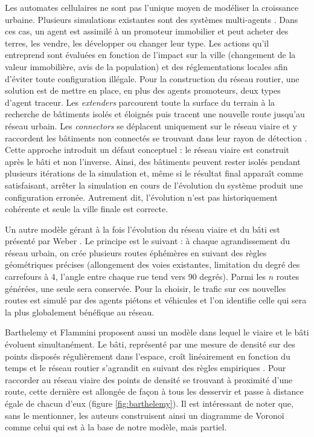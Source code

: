 \documentclass[10pt]{article}
\begin{document}
Les automates cellulaires ne sont pas l'unique moyen de modéliser la
croissance urbaine. Plusieurs simulations existantes sont des systèmes
multi-agents \cite{Lechner2003,Lechner2004}. Dans ces cas, un agent est
assimilé à un promoteur immobilier et peut acheter des terres, les
vendre, les développer ou changer leur type. Les actions qu'il
entreprend sont évaluées en fonction de l'impact sur la ville
(changement de la valeur immobilière, avis de la population) et des
réglementations locales afin d'éviter toute configuration illégale.
Pour la construction du réseau routier, une solution est de mettre en
place, en plus des agents promoteurs, deux types d'agent
traceur. Les \textit{extenders} parcourent toute la surface du
terrain à la recherche de bâtiments isolés et éloignés puis tracent
une nouvelle route jusqu'au réseau urbain. Les \textit{connectors} se
déplacent uniquement sur le réseau viaire et y raccordent les
bâtiments non connectés se trouvant dans leur rayon de détection
\cite{Lechner2003}. Cette approche introduit un défaut conceptuel : le
réseau viaire est construit après le bâti et non l'inverse. Ainsi,
des bâtiments peuvent rester isolés pendant plusieurs itérations de la
simulation et, même si le résultat final apparaît comme satisfaisant,
arrêter la simulation en cours de l'évolution du système produit une
configuration erronée. Autrement dit, l'évolution n'est pas
historiquement cohérente et seule la ville finale est correcte.

Un autre modèle gérant à la fois l'évolution du réseau viaire et du
bâti est présenté par Weber \cite{Weber2009}. Le principe est le
suivant : à chaque agrandissement du réseau urbain, on crée plusieurs
routes éphémères en suivant des règles géométriques précises
(allongement des voies existantes, limitation du degré des carrefours
à 4, l'angle entre chaque rue tend vers 90 degrés). Parmi les $n$
routes générées, une seule sera conservée. Pour la choisir, le trafic
sur ces nouvelles routes est simulé par des agents piétons et
véhicules et l'on identifie celle qui sera la plus globalement
bénéfique au réseau.

Barthelemy et Flammini \cite{Barthelemy2009} proposent aussi un modèle
dans lequel le viaire et le bâti évoluent simultanément. Le bâti,
représenté par une mesure de densité sur des points disposés
régulièrement dans l'espace, croît linéairement en fonction du temps
et le réseau routier s'agrandit en suivant des règles empiriques
\cite{Barthelemy2008}. Pour raccorder au réseau viaire des points de
densité se trouvant à proximité d'une route, cette dernière est
allongée de façon à tous les desservir et passe à distance égale de
chacun d'eux (figure \ref{fig:barthelemy}). Il est intéressant de
noter que, sans le mentionner, les auteurs construisent ainsi un
diagramme de Voronoï comme celui qui est à la base de notre modèle,
mais partiel.
\end{document}
